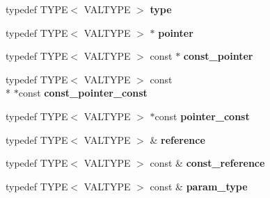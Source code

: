\begin{DoxyCompactItemize}
\item 
\hypertarget{structglm_1_1detail_1_1gen_type_a17dbd44c7a86d09e6ea05b72cb02bccf}{typedef T\-Y\-P\-E$<$ V\-A\-L\-T\-Y\-P\-E $>$ {\bfseries type}}\label{structglm_1_1detail_1_1gen_type_a17dbd44c7a86d09e6ea05b72cb02bccf}

\item 
\hypertarget{structglm_1_1detail_1_1gen_type_a0b4ddd0af4ae5665c60055e5b622808e}{typedef T\-Y\-P\-E$<$ V\-A\-L\-T\-Y\-P\-E $>$ $\ast$ {\bfseries pointer}}\label{structglm_1_1detail_1_1gen_type_a0b4ddd0af4ae5665c60055e5b622808e}

\item 
\hypertarget{structglm_1_1detail_1_1gen_type_ade82fbfd7b15096223e1b133c148b5e2}{typedef T\-Y\-P\-E$<$ V\-A\-L\-T\-Y\-P\-E $>$ const $\ast$ {\bfseries const\-\_\-pointer}}\label{structglm_1_1detail_1_1gen_type_ade82fbfd7b15096223e1b133c148b5e2}

\item 
\hypertarget{structglm_1_1detail_1_1gen_type_a4f3f1bc18abdbdba5757fc63052157fa}{typedef T\-Y\-P\-E$<$ V\-A\-L\-T\-Y\-P\-E $>$ const \\*
$\ast$const {\bfseries const\-\_\-pointer\-\_\-const}}\label{structglm_1_1detail_1_1gen_type_a4f3f1bc18abdbdba5757fc63052157fa}

\item 
\hypertarget{structglm_1_1detail_1_1gen_type_a4d7745054035d7efed18ec1d7215bbf0}{typedef T\-Y\-P\-E$<$ V\-A\-L\-T\-Y\-P\-E $>$ $\ast$const {\bfseries pointer\-\_\-const}}\label{structglm_1_1detail_1_1gen_type_a4d7745054035d7efed18ec1d7215bbf0}

\item 
\hypertarget{structglm_1_1detail_1_1gen_type_a14792cf03ce9cfb37becd2da5d9ae06a}{typedef T\-Y\-P\-E$<$ V\-A\-L\-T\-Y\-P\-E $>$ \& {\bfseries reference}}\label{structglm_1_1detail_1_1gen_type_a14792cf03ce9cfb37becd2da5d9ae06a}

\item 
\hypertarget{structglm_1_1detail_1_1gen_type_a509ca374a85f8a9ea319bc5a980d5f1a}{typedef T\-Y\-P\-E$<$ V\-A\-L\-T\-Y\-P\-E $>$ const \& {\bfseries const\-\_\-reference}}\label{structglm_1_1detail_1_1gen_type_a509ca374a85f8a9ea319bc5a980d5f1a}

\item 
\hypertarget{structglm_1_1detail_1_1gen_type_a92c8b989f574a63d4e0f5bfc8a4f3a32}{typedef T\-Y\-P\-E$<$ V\-A\-L\-T\-Y\-P\-E $>$ const \& {\bfseries param\-\_\-type}}\label{structglm_1_1detail_1_1gen_type_a92c8b989f574a63d4e0f5bfc8a4f3a32}

\end{DoxyCompactItemize}
